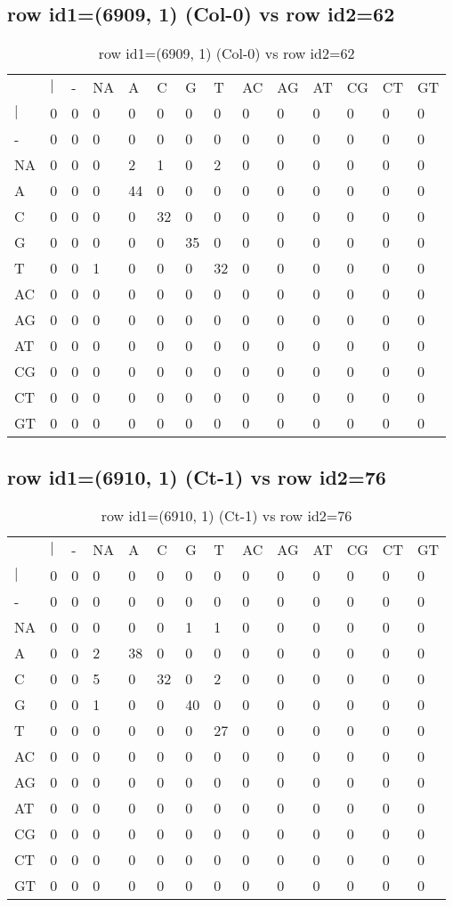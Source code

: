 \subsection{row id1=(6909, 1) (Col-0) vs row id2=62}
\begin{center}
\begin{longtable}{|l|l|l|l|l|l|l|l|l|l|l|l|l|l|}
\caption{row id1=(6909, 1) (Col-0) vs row id2=62} \label{table_dm80}\\
\hline
\\
\hline
&$|$&-&NA&A&C&G&T&AC&AG&AT&CG&CT&GT\\
$|$&0&0&0&0&0&0&0&0&0&0&0&0&0\\
-&0&0&0&0&0&0&0&0&0&0&0&0&0\\
NA&0&0&0&2&1&0&2&0&0&0&0&0&0\\
A&0&0&0&44&0&0&0&0&0&0&0&0&0\\
C&0&0&0&0&32&0&0&0&0&0&0&0&0\\
G&0&0&0&0&0&35&0&0&0&0&0&0&0\\
T&0&0&1&0&0&0&32&0&0&0&0&0&0\\
AC&0&0&0&0&0&0&0&0&0&0&0&0&0\\
AG&0&0&0&0&0&0&0&0&0&0&0&0&0\\
AT&0&0&0&0&0&0&0&0&0&0&0&0&0\\
CG&0&0&0&0&0&0&0&0&0&0&0&0&0\\
CT&0&0&0&0&0&0&0&0&0&0&0&0&0\\
GT&0&0&0&0&0&0&0&0&0&0&0&0&0\\
\hline
\end{longtable}
\end{center}

\subsection{row id1=(6910, 1) (Ct-1) vs row id2=76}
\begin{center}
\begin{longtable}{|l|l|l|l|l|l|l|l|l|l|l|l|l|l|}
\caption{row id1=(6910, 1) (Ct-1) vs row id2=76} \label{table_dm82}\\
\hline
\\
\hline
&$|$&-&NA&A&C&G&T&AC&AG&AT&CG&CT&GT\\
$|$&0&0&0&0&0&0&0&0&0&0&0&0&0\\
-&0&0&0&0&0&0&0&0&0&0&0&0&0\\
NA&0&0&0&0&0&1&1&0&0&0&0&0&0\\
A&0&0&2&38&0&0&0&0&0&0&0&0&0\\
C&0&0&5&0&32&0&2&0&0&0&0&0&0\\
G&0&0&1&0&0&40&0&0&0&0&0&0&0\\
T&0&0&0&0&0&0&27&0&0&0&0&0&0\\
AC&0&0&0&0&0&0&0&0&0&0&0&0&0\\
AG&0&0&0&0&0&0&0&0&0&0&0&0&0\\
AT&0&0&0&0&0&0&0&0&0&0&0&0&0\\
CG&0&0&0&0&0&0&0&0&0&0&0&0&0\\
CT&0&0&0&0&0&0&0&0&0&0&0&0&0\\
GT&0&0&0&0&0&0&0&0&0&0&0&0&0\\
\hline
\end{longtable}
\end{center}

